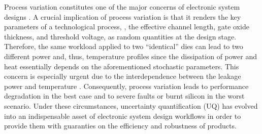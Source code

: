 Process variation constitutes one of the major concerns of electronic system designs \cite{chandrakasan2001, srivastava2010}.
A crucial implication of process variation is that it renders the key parameters of a technological process, \eg, the effective channel length, gate oxide thickness, and threshold voltage, as random quantities at the design stage.
Therefore, the same workload applied to two ``identical'' dies can lead to two different power and, thus, temperature profiles since the dissipation of power and heat essentially depends on the aforementioned stochastic parameters.
This concern is especially urgent due to the interdependence between the leakage power and temperature \cite{srivastava2010}.
Consequently, process variation leads to performance degradation in the best case and to severe faults or burnt silicon in the worst scenario.
Under these circumstances, uncertainty quantification (UQ) \cite{xiu2010, maitre2010} has evolved into an indispensable asset of electronic system design workflows in order to provide them with guaranties on the efficiency and robustness of products.
